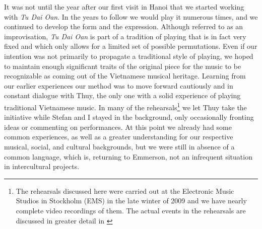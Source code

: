 \documentclass[a4paper]{article}
\begin{document}
It was not until the year after our first visit in Hanoi that we started working with \emph{Tu Dai Oan}. In the years to follow we would play it numerous times, and we continued to develop the form and the expression. Although referred to as an improvisation, \emph{Tu Dai Oan} is part of a tradition of playing that is in fact very fixed and which only allows for a limited set of possible permutations. Even if our intention was not primarily to propagate a traditional style of playing, we hoped to maintain enough significant traits of the original piece for the music to be recognizable as coming out of the Vietnamese musical heritage. Learning from our earlier experiences our method was to move forward cautiously and in constant dialogue with Thuy, the only one with a solid experience of playing traditional Vietnamese music. In many of the rehearsals\footnote{The rehearsals discussed here were carried out at the Electronic Music Studios in Stockholm (EMS) in the late winter of 2009 and we have nearly complete video recordings of them. The actual events in the rehearsals are discussed in greater detail in \autocite{Ostersjo2013}} we let Thuy take the initiative while Stefan and I stayed in the background, only occasionally fronting ideas or commenting on performances. At this point we already had some common experiences, as well as a greater understanding for our respective musical, social, and cultural backgrounds, but we were still in absence of a common language, which is, returning to Emmerson, not an infrequent situation in intercultural projects. 
\end{document}

